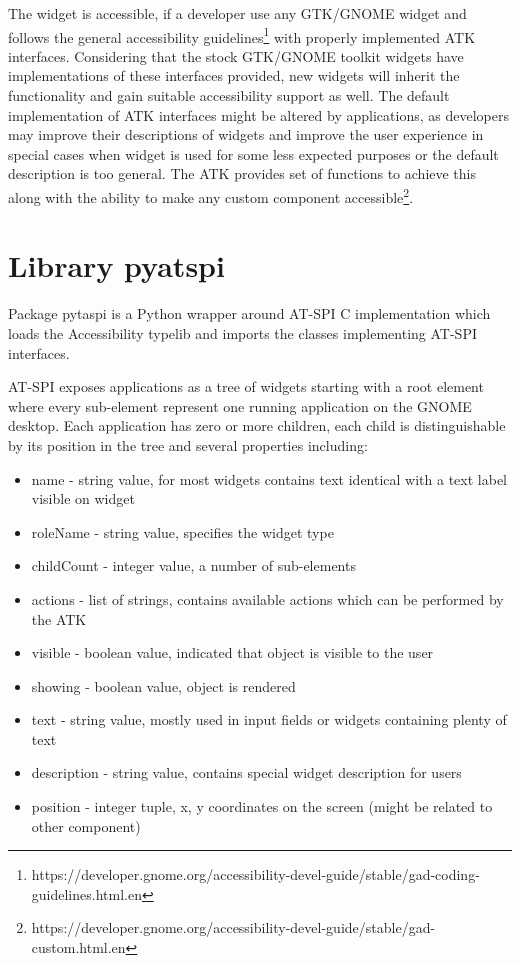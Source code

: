 The widget is accessible, if a developer use any GTK/GNOME widget and follows the general accessibility guidelines\footnote{https://developer.gnome.org/accessibility-devel-guide/stable/gad-coding-guidelines.html.en} with properly implemented ATK interfaces. Considering that the stock GTK/GNOME toolkit widgets have implementations of these interfaces provided, new widgets will inherit the functionality and gain suitable accessibility support as well. The default implementation of ATK interfaces might be altered by applications, as developers may improve their descriptions of widgets and improve the user experience in special cases when widget is used for some less expected purposes or the default description is too general. The ATK provides set of functions to achieve this along with the ability to make any custom component accessible\footnote{https://developer.gnome.org/accessibility-devel-guide/stable/gad-custom.html.en}.\cite{accessibleWidgets}

\newpage
\section{Library pyatspi}
Package pytaspi is a Python wrapper around AT-SPI C implementation which loads the Accessibility typelib and imports the classes implementing AT-SPI interfaces.\cite{pyatspi}

AT-SPI exposes applications as a tree of widgets starting with a root element where every sub-element represent one running application on the GNOME desktop. Each application has zero or more children, each child is distinguishable by its position in the tree and several properties including:
\begin{itemize}
    \item name - string value, for most widgets contains text identical with a text label visible on widget
    \item roleName - string value, specifies the widget type
    \item childCount - integer value, a number of sub-elements 
    \item actions - list of strings, contains available actions which can be performed by the ATK
    \item visible - boolean value, indicated that object is visible to the user
    \item showing - boolean value, object is rendered
    \item text - string value, mostly used in input fields or widgets containing plenty of text
    \item description - string value, contains special widget description for users
    \item position - integer tuple, x, y coordinates on the screen (might be related to other component)
\end{itemize}

